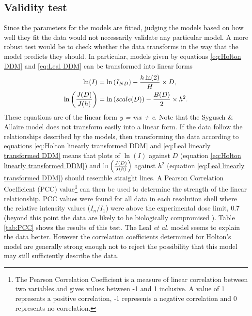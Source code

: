\subsection{Validity test}
\label{sub:Validity Test}
Since the parameters for the models are fitted, judging the models based on how well they fit the data would not necessarily validate any particular model.
A more robust test would be to check whether the data transforms in the way that the model predicts they should.
In particular, models given by equations \ref{eq:Holton DDM} and \ref{eq:Leal DDM} can be transformed into linear forms
\begin{align}
\ln(I) &= \ln\left( I_{ND} \right) - \frac{h \ln(2)}{H} \times D \label{eq:Holton linearly transformed DDM}, \\
\ln \left(\frac{J(D)}{J(h)}\right) &= \ln\left( scale(D) \right) - \frac{B(D)}{2} \times h^2 \label{eq:Leal linearly transformed DDM}. \\
\end{align}
These equations are of the linear form \textit{y = mx + c}.
Note that the Sygusch \& Allaire model does not transform easily into a linear form.
If the data follow the relationships described by the models, then transforming the data according to equations \ref{eq:Holton linearly transformed DDM} and \ref{eq:Leal linearly transformed DDM} means that plots of $\ln(I)$ against $D$ (equation \ref{eq:Holton linearly transformed DDM}) and $\ln \left(\frac{J(D)}{J(h)}\right)$ against $h^2$ (equation \ref{eq:Leal linearly transformed DDM}) should resemble straight lines.
A Pearson Correlation Coefficient (PCC) value\footnote{The Pearson Correlation Coefficient is a measure of linear correlation between two variables and gives values between -1 and 1 inclusive.
A value of 1 represents a positive correlation, -1 represents a negative correlation and 0 represents no correlation.} can then be used to determine the strength of the linear relationship.
PCC values were found for all data in each resolution shell where the relative intensity values ($I_n/I_1$) were above the experimental dose limit, 0.7 (beyond this point the data are likely to be biologically compromised \cite{owen2006}).
Table \ref{tab:PCC} shows the results of this test.
The Leal \emph{et al.} model seems to explain the data better.
However the correlation coefficients determined for Holton's model are generally strong enough not to reject the possibility that this model may still sufficiently describe the data.
